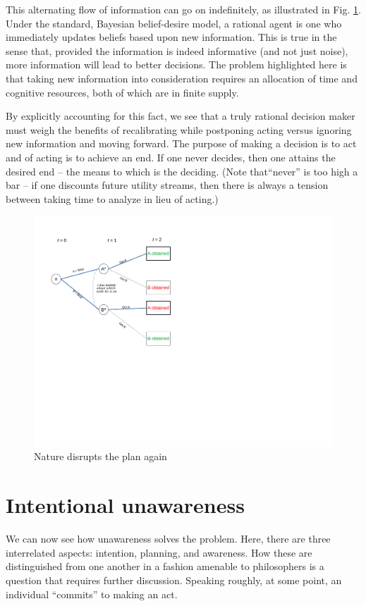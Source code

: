 \documentclass[
11pt,
titlepage,
reqno,
]{article}%
\theoremstyle{definition}
\begin{document}
This alternating flow of information can go on indefinitely, as illustrated in Fig. \ref{Diag: p-10}. Under the standard, Bayesian belief-desire model, a rational agent is one who immediately updates beliefs based upon new information. This is true in the sense that, provided the information is indeed informative (and not just noise), more information will lead to better decisions. The problem highlighted here is that taking new information into consideration requires an allocation of time and cognitive resources, both of which are in finite supply. 

By explicitly accounting for this fact, we see that a truly rational decision maker must weigh the benefits of recalibrating while postponing acting versus ignoring new information and moving forward. The purpose of making a decision is to act and of acting is to achieve an end. If one never decides, then one attains the desired end -- the means to which is the deciding. (Note that``never'' is too high a bar -- if one discounts future utility streams, then there is always a tension between taking time to analyze in lieu of acting.)

\begin{figure}[h!]
	\centering
	\includegraphics*[page=10,trim = 0 3.5in 0in 0in,scale=.65]{Awareness_Diagrams_All}
	\caption{Nature disrupts the plan again\label{Diag: p-10}}%
\end{figure}

\section{Intentional unawareness}
We can now see how unawareness solves the problem. Here, there are three interrelated aspects: intention, planning, and awareness. How these are distinguished from one another in  a fashion amenable to philosophers is a question that requires further discussion. Speaking roughly, at some point, an individual ``commits'' to making an act.
\end{document}
